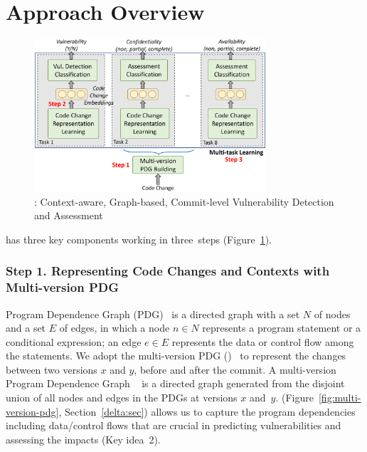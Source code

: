 \section{Approach Overview}
\label{overview:sec}

\begin{figure}[t]
	\centering
	\includegraphics[width=3.4in]{graphs/overview-4.png}
	\vspace{-16pt}
	\caption{{\tool}: Context-aware, Graph-based, Commit-level
Vulnerability Detection and Assessment}
	\label{fig:overview}
\end{figure}


\noindent {\tool} has three key components working in three~steps
(Figure~\ref{fig:overview}).


\vspace{2pt}
\subsubsection*{{\bf Step 1. Representing Code Changes and Contexts with Multi-version PDG}}
Program Dependence Graph (PDG)~\cite{pdg} is a directed graph with a
set $N$ of nodes and a set $E$ of edges, in which a node $n \in N$
represents a program statement or a conditional expression; an edge $e
\in E$ represents the data or control flow among the statements.
We adopt the multi-version PDG ({\mvpdgxy})~\cite{flexeme-fse20} to
represent the changes between two versions $x$ and $y$, before and
after the commit.  A multi-version Program Dependence Graph
{\mvpdgxy}~\cite{flexeme-fse20} is a directed graph generated from the
disjoint union of all nodes and edges in the PDGs at versions $x$
and~$y$. {\mvpdgxy} (Figure~\ref{fig:multi-version-pdg},
Section~\ref{delta:sec}) allows us to capture the program dependencies
including data/control flows that are crucial in predicting
vulnerabilities and assessing the impacts (Key
idea~2).


